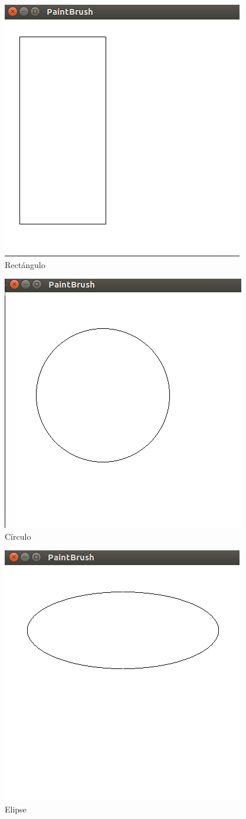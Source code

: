 \documentclass[a4paper,12pt]{article}
\begin{document}
\begin{figure}[H]
 \centering
 \includegraphics[scale = 0.5]{3.png}
 \caption{Rectángulo}
\end{figure}
\begin{figure}[H]
 \centering
 \includegraphics[scale = 0.5]{4.png}
 \caption{Círculo}
\end{figure}
\begin{figure}[H]
 \centering
 \includegraphics[scale = 0.5]{5.png}
 \caption{Elipse}
\end{figure}
\end{document}
